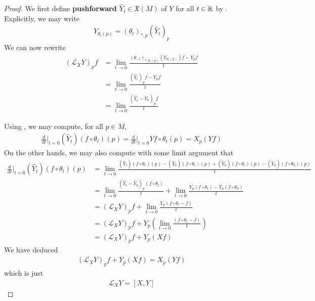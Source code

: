 \documentclass{report}
\begin{document}
\begin{proof}
We first define \textbf{pushforward $\widehat{Y}_t \in \mathfrak{X}(M)$} of $Y$ for all $t\in\mathbb{R}$ by . Explicitly, we may write 
\begin{align*}
  Y_{\theta_t(p)}=(\theta_t)_{*,p}(\widehat{Y}_t)_p
\end{align*}
We can now rewrite 
\begin{align*}
(\mathcal{L}_XY)_pf&= \lim_{t\to 0} \frac{(\theta_{-t})_{*,\theta_t(p)}(Y_{\theta_t(p)})f-Y_pf}{t} \\
&= \lim_{t\to 0} \frac{(\widehat{Y}_t)_pf-Y_pf}{t} \\
&=\lim_{t\to 0} \frac{(\widehat{Y}_t-\widehat{Y}_0)_pf}{t} 
\end{align*}



Using , we may compute, for all $p\in M$, 
\begin{align*}
\frac{d }{dt}\Big|_{t=0}(\widehat{Y}_t)(f\circ \theta_t)(p)= \frac{d }{d t}\Big|_{t=0}Yf\circ \theta_t (p)=X_p(Yf)
\end{align*}
On the other hands, we may also compute with some limit argument that  
\begin{align*}
  \frac{d}{dt}\Big|_{t=0}(\widehat{Y}_t)(f\circ \theta_t)(p)&=\lim_{t\to 0} \frac{(\widehat{Y}_t)(f\circ \theta_t)(p)-(\widehat{Y}_0)(f\circ \theta_t)(p)+(\widehat{Y}_0)(f\circ \theta_t)(p)-(\widehat{Y}_0)(f\circ \theta_0)(p)}{t}\\
&=\lim_{t\to 0}  \frac{(\widehat{Y}_t-\widehat{Y}_0)_p(f\circ \theta_t)}{t} + \lim_{t\to 0} \frac{Y_p(f\circ \theta_t)-Y_p(f\circ \theta_0)}{t} \\
&=(\mathcal{L}_XY)_pf+ \lim_{t\to 0} \frac{Y_p(f\circ \theta_t-f)}{t} \\
&=(\mathcal{L}_XY)_pf+ Y_p(\lim_{t\to 0} \frac{(f\circ \theta_t-f)}{t}) \\
&= (\mathcal{L}_XY)_pf+ Y_p(Xf)
\end{align*}
We have deduced
\begin{align*}
  (\mathcal{L}_XY)_pf+Y_p(Xf)=X_p(Yf)
\end{align*}
which is just 
\begin{align*}
\mathcal{L}_XY=[X,Y]
\end{align*}
\end{proof}
\end{document}

